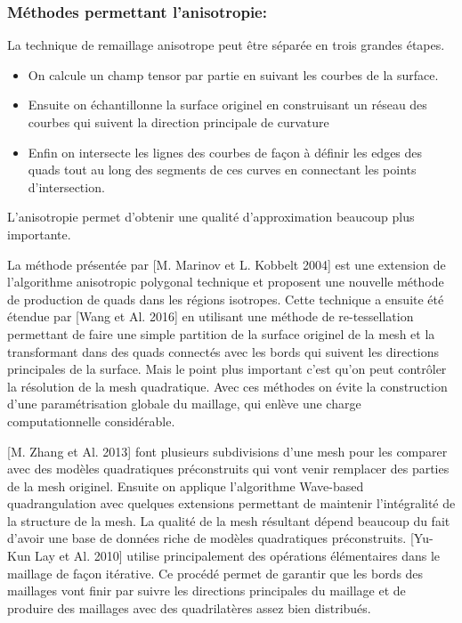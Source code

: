 \documentclass[runningheads]{llncs}
\begin{document}
\subsubsection{Méthodes permettant l'anisotropie:}
La technique de remaillage anisotrope peut être séparée en trois grandes étapes. 
\begin{itemize}
  \item  On calcule un champ tensor par partie en suivant les courbes de la surface.
  \item  Ensuite on échantillonne la surface originel en construisant un réseau des courbes qui suivent la direction principale de curvature
  \item Enfin on intersecte les lignes des courbes de façon à définir les edges des quads tout au long des segments de ces curves en connectant les points d’intersection.
\end{itemize}
L'anisotropie permet d’obtenir une qualité d'approximation beaucoup plus importante.


La méthode présentée par [M. Marinov et  L. Kobbelt 2004]\cite{marinov_direct_2004} est une extension de l'algorithme anisotropic polygonal technique et proposent une nouvelle méthode de production de quads dans les régions isotropes. Cette technique a ensuite été étendue par [Wang et Al. 2016]\cite{wang_retiling_2016} en utilisant une méthode de re-tessellation permettant de faire une simple partition de la surface originel de la mesh et la transformant dans des quads connectés avec les bords qui suivent les directions principales de la surface. Mais le point plus important c’est qu’on peut contrôler la résolution de la mesh quadratique. Avec ces méthodes on évite la construction d’une paramétrisation globale du maillage, qui enlève une charge computationnelle considérable.

[M. Zhang et Al. 2013]\cite{muyang_zhang_divide-and-conquer_2013} font plusieurs subdivisions d’une mesh pour les comparer avec des modèles quadratiques préconstruits qui vont venir remplacer des parties de la mesh originel. Ensuite on applique l'algorithme Wave-based quadrangulation avec quelques extensions permettant de maintenir l'intégralité de la structure de la mesh. La qualité de la mesh résultant dépend beaucoup du fait d’avoir une base de données riche de modèles quadratiques préconstruits.
[Yu-Kun Lay et Al. 2010]\cite{lai_feature_2010} utilise principalement des opérations élémentaires dans le maillage de façon itérative. Ce procédé permet de garantir que les bords des maillages vont finir par suivre les directions principales du maillage et de produire des maillages avec des quadrilatères assez bien distribués.
\end{document}
